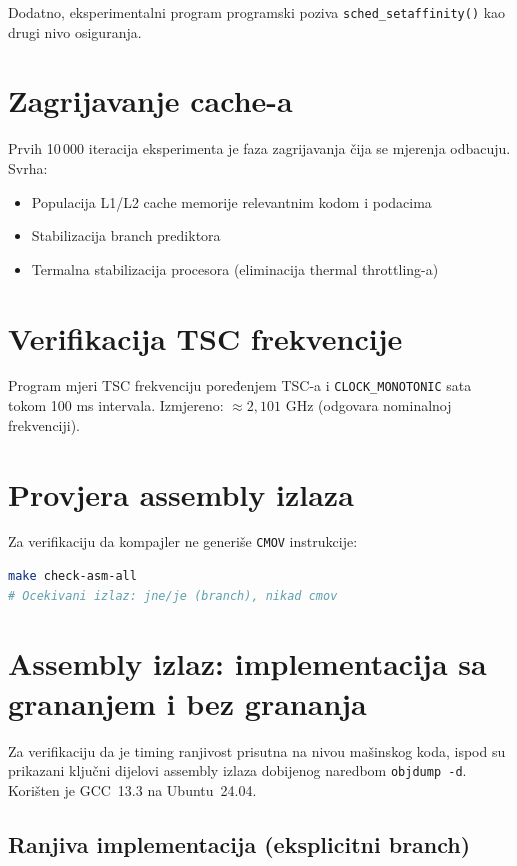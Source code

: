 Dodatno, eksperimentalni program programski poziva \texttt{sched\_setaffinity()} kao drugi nivo osiguranja.

\section{Zagrijavanje cache-a}

Prvih 10\,000 iteracija eksperimenta je faza zagrijavanja čija se mjerenja odbacuju. Svrha:
\begin{itemize}
\item Populacija L1/L2 cache memorije relevantnim kodom i podacima
\item Stabilizacija branch prediktora
\item Termalna stabilizacija procesora (eliminacija thermal throttling-a)
\end{itemize}

\section{Verifikacija TSC frekvencije}

Program mjeri TSC frekvenciju poređenjem TSC-a i \texttt{CLOCK\_MONOTONIC} sata tokom 100 ms intervala. Izmjereno: $\approx 2{,}101$ GHz (odgovara nominalnoj frekvenciji).

\section{Provjera assembly izlaza}

Za verifikaciju da kompajler ne generiše \texttt{CMOV} instrukcije:

\begin{lstlisting}[language=bash, caption={Provjera assembly koda za branch instrukcije}]
make check-asm-all
# Ocekivani izlaz: jne/je (branch), nikad cmov
\end{lstlisting}

\section{Assembly izlaz: implementacija sa grananjem i bez grananja}
\label{app:asm_output}

Za verifikaciju da je timing ranjivost prisutna na nivou mašinskog koda, ispod su prikazani ključni dijelovi assembly izlaza dobijenog naredbom \texttt{objdump~-d}. Korišten je GCC~13.3 na Ubuntu~24.04.

\subsection{Ranjiva implementacija (eksplicitni branch)}

